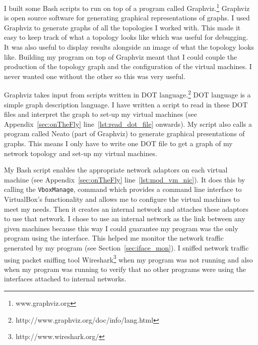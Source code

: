 \documentclass[12pt]{article}
\begin{document}
I built some Bash scripts to run on top
of a program called Graphviz.\footnote{www.graphviz.org}
Graphviz is open source software for generating graphical
representations of graphs.
I used Graphviz to generate graphs of all the topologies I worked
with. This made it easy to keep track of what a topology looks like
which was useful for debugging. It was also useful to display results
alongside an image of what the topology looks like. Building my
program on top of Graphviz meant that I could couple the production
of the topology graph and the configuration of the virtual machines.
I never wanted one without the other so this was very useful.

Graphviz takes input from scripts written in DOT language.\footnote{
http://www.graphviz.org/doc/info/lang.html} DOT language is a simple
graph description language.
I have written a script to read in these DOT files and interpret
the graph to set-up my virtual machines (see Appendix~\ref{sec:onTheFly}
 line~\ref{lst:read_dot_file} onwards).
My script also calls a program called Neato (part of Graphviz) to generate 
graphical presentations of graphs.
This means I only have to write one DOT file to get a graph of
my network topology and set-up my virtual machines.

My Bash script enables the appropriate network adaptors on
each virtual machine (see Appendix~\ref{sec:onTheFly} line~\ref{lst:mod_vm_nic}).
It does this by calling the \texttt{VboxManage}, command which provides
a command line interface to VirtualBox's functionality and allows
me to configure the virtual machines to meet my needs.
Then it creates an internal network and attaches these adaptors to use that
network. 
I chose to use an internal network
as the link between any given machines because this way I could
guarantee my program
was the only program using the interface.
This helped me monitor the network traffic generated by
my program (see Section~\ref{sec:iface_mon}).
I sniffed network traffic using packet sniffing tool
Wireshark\footnote{http://www.wireshark.org/}
when my program was not running and also when my program was running
to verify that no other programs were using the interfaces attached to
internal networks.
\end{document}
